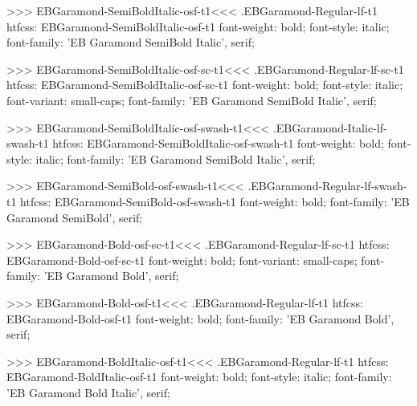 {{{{{{{>>>
\<EBGaramond-SemiBoldItalic-osf-t1\><<<
.EBGaramond-Regular-lf-t1
htfcss:  EBGaramond-SemiBoldItalic-osf-t1  font-weight: bold; font-style: italic; font-family: 'EB Garamond SemiBold Italic', serif;

>>>
\<EBGaramond-SemiBoldItalic-osf-sc-t1\><<<
.EBGaramond-Regular-lf-sc-t1
htfcss:  EBGaramond-SemiBoldItalic-osf-sc-t1  font-weight: bold; font-style: italic; font-variant: small-caps; font-family: 'EB Garamond SemiBold Italic', serif;

>>>
\<EBGaramond-SemiBoldItalic-osf-swash-t1\><<<
.EBGaramond-Italic-lf-swash-t1
htfcss:  EBGaramond-SemiBoldItalic-osf-swash-t1  font-weight: bold; font-style: italic; font-family: 'EB Garamond SemiBold Italic', serif;

>>>
\<EBGaramond-SemiBold-osf-swash-t1\><<<
.EBGaramond-Regular-lf-swash-t1
htfcss:  EBGaramond-SemiBold-osf-swash-t1  font-weight: bold; font-family: 'EB Garamond SemiBold', serif;

>>>
\<EBGaramond-Bold-osf-sc-t1\><<<
.EBGaramond-Regular-lf-sc-t1
htfcss:  EBGaramond-Bold-osf-sc-t1  font-weight: bold; font-variant: small-caps; font-family: 'EB Garamond Bold', serif;

>>>
\<EBGaramond-Bold-osf-t1\><<<
.EBGaramond-Regular-lf-t1
htfcss:  EBGaramond-Bold-osf-t1  font-weight: bold; font-family: 'EB Garamond Bold', serif;

>>>
\<EBGaramond-BoldItalic-osf-t1\><<<
.EBGaramond-Regular-lf-t1
htfcss:  EBGaramond-BoldItalic-osf-t1  font-weight: bold; font-style: italic; font-family: 'EB Garamond Bold Italic', serif;

}}}}}}}
